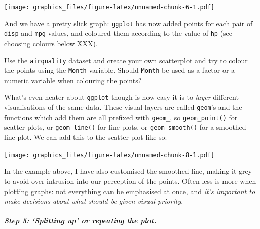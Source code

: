 \documentclass[]{article}
\newenvironment{Shaded}{\begin{snugshade}}{\end{snugshade}}
\newcommand{\KeywordTok}[1]{\textcolor[rgb]{0.13,0.29,0.53}{\textbf{#1}}}
\newcommand{\DataTypeTok}[1]{\textcolor[rgb]{0.13,0.29,0.53}{#1}}
\newcommand{\DecValTok}[1]{\textcolor[rgb]{0.00,0.00,0.81}{#1}}
\newcommand{\StringTok}[1]{\textcolor[rgb]{0.31,0.60,0.02}{#1}}
\newcommand{\OperatorTok}[1]{\textcolor[rgb]{0.81,0.36,0.00}{\textbf{#1}}}
\newcommand{\NormalTok}[1]{#1}
\let\oldsubparagraph\subparagraph
\renewcommand{\subparagraph}[1]{\oldsubparagraph{#1}\mbox{}}
\theoremstyle{definition}
\theoremstyle{definition}
\theoremstyle{definition}
\theoremstyle{remark}
\begin{document}
\texttt{[image: graphics\_files/figure-latex/unnamed-chunk-6-1.pdf]}

And we have a pretty slick graph: \texttt{ggplot} has now added points
for each pair of \texttt{disp} and \texttt{mpg} values, and coloured
them according to the value of \texttt{hp} (see choosing colours below
XXX).

{Use the \texttt{airquality} dataset and create your own scatterplot and
try to colour the points using the \texttt{Month} variable. Should
\texttt{Month} be used as a factor or a numeric variable when colouring
the points?}

What's even neater about \texttt{ggplot} though is how easy it is to
\emph{layer} different visualisations of the same data. These visual
layers are called \texttt{geom}'s and the functions which add them are
all prefixed with \texttt{geom\_}, so \texttt{geom\_point()} for scatter
plots, or \texttt{geom\_line()} for line plots, or
\texttt{geom\_smooth()} for a smoothed line plot. We can add this to the
scatter plot like so:

\begin{Shaded}
\end{Shaded}

\texttt{[image: graphics\_files/figure-latex/unnamed-chunk-8-1.pdf]}

In the example above, I have also customised the smoothed line, making
it grey to avoid over-intrusion into our perception of the points. Often
less is more when plotting graphs: not everything can be emphasised at
once, and \emph{it's important to make decisions about what should be
given visual priority}.

\subparagraph{\texorpdfstring{Step 5: `Splitting up' or repeating the
plot.}{Step 5: Splitting up or repeating the plot.}}\label{step-5-splitting-up-or-repeating-the-plot.}
\end{document}
